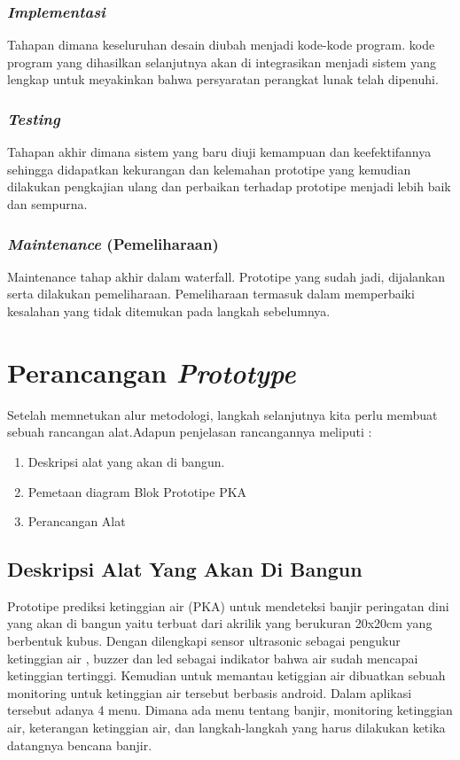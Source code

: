 \subsubsection{\textit{Implementasi}}
Tahapan dimana keseluruhan desain diubah menjadi kode-kode program. kode program yang dihasilkan selanjutnya akan di integrasikan menjadi sistem yang lengkap untuk meyakinkan bahwa persyaratan perangkat lunak telah dipenuhi.
\subsubsection{\textit{Testing}}
Tahapan akhir dimana sistem yang baru diuji kemampuan dan keefektifannya sehingga didapatkan kekurangan dan kelemahan prototipe yang kemudian dilakukan pengkajian ulang dan perbaikan terhadap prototipe menjadi lebih baik dan sempurna.
\subsubsection{\textit{Maintenance} (Pemeliharaan)}
Maintenance tahap akhir dalam  waterfall. Prototipe yang  sudah  jadi,  dijalankan  serta dilakukan  pemeliharaan. Pemeliharaan termasuk dalam memperbaiki  kesalahan yang tidak ditemukan pada langkah sebelumnya. 

\section{Perancangan \textit{Prototype}}
Setelah memnetukan alur metodologi, langkah selanjutnya kita perlu membuat sebuah rancangan alat.Adapun penjelasan rancangannya meliputi :
\begin{enumerate}
    \item Deskripsi alat yang akan di bangun.
    \item Pemetaan diagram Blok Prototipe PKA
    \item Perancangan Alat 
\end{enumerate}
\subsection{Deskripsi Alat Yang Akan Di Bangun}
Prototipe prediksi ketinggian air (PKA) untuk mendeteksi banjir peringatan dini yang akan di bangun yaitu terbuat dari akrilik yang berukuran 20x20cm yang berbentuk kubus. Dengan dilengkapi sensor ultrasonic sebagai pengukur ketinggian air , buzzer dan led sebagai indikator bahwa air sudah mencapai ketinggian tertinggi. Kemudian untuk memantau ketiggian air dibuatkan sebuah monitoring untuk ketinggian air tersebut berbasis android. Dalam aplikasi tersebut adanya 4 menu. Dimana ada menu tentang banjir, monitoring ketinggian air, keterangan ketinggian  air, dan langkah-langkah yang harus dilakukan ketika datangnya bencana banjir.
